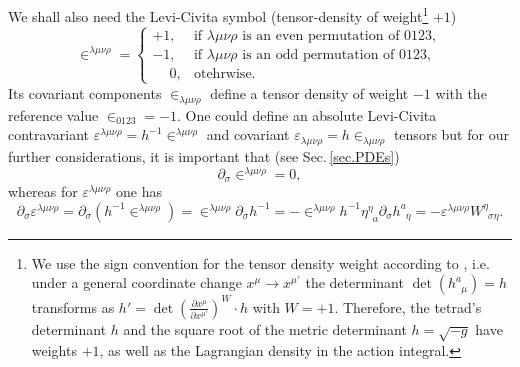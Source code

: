 \documentclass[
10pt, %
a4paper, %
oneside, %
headinclude,footinclude, %
BCOR5mm, %
]{scrartcl}
\newcommand{\pd}[1]{\partial_{#1}}
\newcommand{\tetrsymbol}{h}
\newcommand{\itetrsymbol}{\eta}
\newcommand{\itetr}[2]{\itetrsymbol^{#1}_{\phantom{#1}#2}}
\newcommand{\tetr}[2]{\tetrsymbol^{#1}_{\phantom{#1}#2}}
\newcommand{\detTetr}{\tetrsymbol}
\newcommand{\D}[1]{\partial_{#1}} %
\newcommand{\w}[2]{W^{#1}_{\phantom{#1}#2}}
\newcommand{\LCsymb}{\bm{\in}}    %
\newcommand{\LCtens}{\varepsilon} %
\begin{document}
We shall also need the Levi-Civita symbol (tensor-density of weight\footnote{We 
	use the 
	sign convention for the tensor density weight according to \cite{Ryder2009,Grinfeld2013}, i.e.
	under a 
	general 
	coordinate change $ x^\mu \to x^{\mu'} $ the determinant $ \det(\tetr{a}{\mu}) = \detTetr $ 
	transforms as $ \detTetr' = \det \left(\frac{\partial x^\mu}{\partial x^{\mu'}} \right)^W 
	\cdot \detTetr $ with $ W=+1 $. Therefore, the tetrad's determinant $ \detTetr $ and the 
	square root of the metric determinant $ \detTetr = \sqrt{-g} $ have weights $ +1 $, as well as 
	the Lagrangian density in the action integral.} $ +1 $)
\begin{equation}\label{eqn.LCsymbol.def}
	\LCsymb^{\lambda\mu\nu\rho} = 
	\left\{ 
	\begin{array}{ll}
	 +1,	& \text{if \ }\lambda\mu\nu\rho \text{ is an even permutation of } 0123,\\[2mm]
     -1,	& \text{if \ }\lambda\mu\nu\rho \text{ is an odd \ permutation of } 0123,\\[2mm]
	  \phantom{-}0,	& \text{otehrwise}.
	\end{array}
	\right.
\end{equation}
Its covariant components $ \LCsymb_{\lambda\mu\nu\rho} $ define a tensor density of weight $ -1 $ 
with the reference value $ \LCsymb_{0123} = -1 $. One could define an absolute 
Levi-Civita 
contravariant $ \LCtens^{\lambda\mu\nu\rho} = h^{-1} \LCsymb^{\lambda\mu\nu\rho} $ 
and covariant $ \LCtens_{\lambda\mu\nu\rho} = h \LCsymb_{\lambda\mu\nu\rho} $ tensors  
but for our further considerations, it is important that 
(see Sec.\,\ref{sec.PDEs})
\begin{equation}\label{eqn.diff.LCsymb}
\D{\sigma}\LCsymb^{\lambda\mu\nu\rho} = 0,
\end{equation}
whereas for $ \LCtens^{\lambda\mu\nu\rho} $ one has
\begin{equation}\label{eqn.diff.LeviCivita}
\D{\sigma}\LCtens^{\lambda\mu\nu\rho} = 
\pd{\sigma}(\detTetr^{-1}\LCsymb^{\lambda\mu\nu\rho}) = 
\LCsymb^{\lambda\mu\nu\rho}\pd{\sigma}\detTetr^{-1} = 
-\LCsymb^{\lambda\mu\nu\rho}\detTetr^{-1}\itetr{\eta}{a}\pd{\sigma}\tetr{a}{\eta} = 
-\LCtens^{\lambda\mu\nu\rho}\w{\eta}{\sigma\eta}. 
\end{equation}



%
\end{document}
